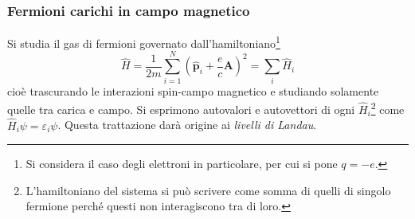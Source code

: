 \documentclass[11pt, a4paper]{scrartcl}
\theoremstyle{style}
\theoremstyle{style1}
\numberwithin{equation}{subsection}
\begin{document}
\subsubsection{Fermioni carichi in campo magnetico}
Si studia il gas di fermioni governato dall'hamiltoniano\footnote{Si considera il caso degli elettroni in particolare, per cui si pone $q = -e$.}
\[
\hat{H} = \frac{1}{2m}\sum_{i=1}^{N}  \left(\hat{\mathbf{p} }_i + \frac{e}{c} \mathbf{A} \right) ^2 = \sum_{i}^{} \hat{H}_i
\] 
cio\`e trascurando le interazioni spin-campo magnetico e studiando solamente quelle tra carica e campo.
Si esprimono autovalori e autovettori di ogni $\hat{H}_i$\footnote{L'hamiltoniano del sistema si pu\`o scrivere come somma di quelli di singolo fermione perch\'e questi non interagiscono tra di loro.} come $\hat{H}_i \psi  = \varepsilon _i \psi $.
Questa trattazione dar\`a origine ai \textit{livelli di Landau}.
\end{document}
